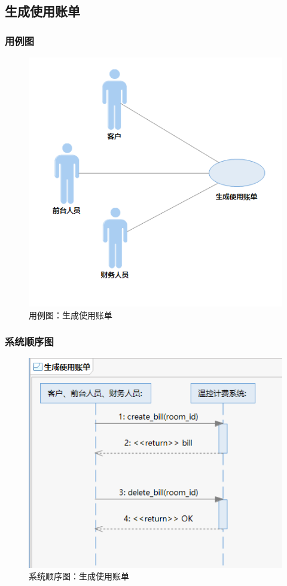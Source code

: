 \documentclass[black,normal,cn]{elegantnote}
\begin{document}
\subsection{生成使用账单}
\subsubsection{用例图}

\begin{figure}[H]
    \centering
    \includegraphics[width=.5\textwidth]{fig/276003.png}
    \caption{用例图：生成使用账单}
    \label{fig:276003}
\end{figure}

\subsubsection{系统顺序图}

\begin{figure}[H]
    \centering
    \includegraphics[width=.8\textwidth]{fig/276004.png}
    \caption{系统顺序图：生成使用账单}
    \label{fig:276004}
\end{figure}
\end{document}
